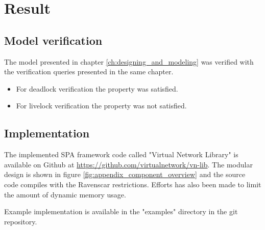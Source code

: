 \chapter{Result}\label{ch:result}
\section{Model verification}
The model presented in chapter \ref{ch:designing_and_modeling} was verified
with the verification queries presented in the same chapter.

\begin{itemize}
    \item For deadlock verification the property was satisfied.
    \item For livelock verification the property was not satisfied.
\end{itemize}


\section{Implementation}
The implemented SPA framework code called "Virtual Network Library" is
available on Github at \url{https://github.com/virtualnetwork/vn-lib}. The
modular design is shown in figure \ref{fig:appendix_component_overview} and the
source code compiles with the Ravenscar restrictions. Efforts has also been
made to limit the amount of dynamic memory usage.

Example implementation is available in the "examples" directory in the git
repository.
